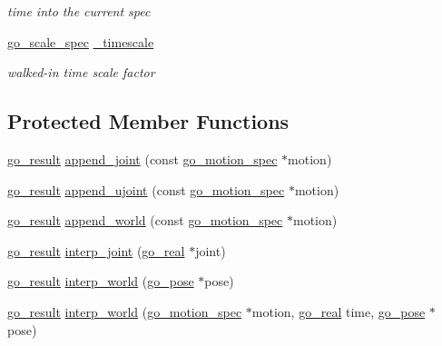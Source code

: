 \begin{DoxyCompactItemize}
\begin{DoxyCompactList}\small\item\em time into the current spec \end{DoxyCompactList}\item 
\hyperlink{structgomotion_1_1go__scale__spec}{go\-\_\-scale\-\_\-spec} \hyperlink{structgomotion_1_1go__motion__queue_a78ce1642f13b46e810ae781a827408e6}{\-\_\-timescale}
\begin{DoxyCompactList}\small\item\em walked-\/in time scale factor \end{DoxyCompactList}\end{DoxyCompactItemize}
\subsection*{Protected Member Functions}
\begin{DoxyCompactItemize}
\item 
\hyperlink{gotypes_8h_a55d48b38cd959f63c7e8db8337a9792a}{go\-\_\-result} \hyperlink{structgomotion_1_1go__motion__queue_a8530405c3ab2eb49c99b78804af3110f}{append\-\_\-joint} (const \hyperlink{structgomotion_1_1go__motion__spec}{go\-\_\-motion\-\_\-spec} $\ast$motion)
\item 
\hyperlink{gotypes_8h_a55d48b38cd959f63c7e8db8337a9792a}{go\-\_\-result} \hyperlink{structgomotion_1_1go__motion__queue_a9764d6dc903c426e1e5277bc2ffd26bc}{append\-\_\-ujoint} (const \hyperlink{structgomotion_1_1go__motion__spec}{go\-\_\-motion\-\_\-spec} $\ast$motion)
\item 
\hyperlink{gotypes_8h_a55d48b38cd959f63c7e8db8337a9792a}{go\-\_\-result} \hyperlink{structgomotion_1_1go__motion__queue_a59948ff83135837e9b87385a4b220571}{append\-\_\-world} (const \hyperlink{structgomotion_1_1go__motion__spec}{go\-\_\-motion\-\_\-spec} $\ast$motion)
\item 
\hyperlink{gotypes_8h_a55d48b38cd959f63c7e8db8337a9792a}{go\-\_\-result} \hyperlink{structgomotion_1_1go__motion__queue_a6d7f6a8773b64aa9dfa95639288634c6}{interp\-\_\-joint} (\hyperlink{gotypes_8h_afd666a2393eebd71ee455846ac9def9b}{go\-\_\-real} $\ast$joint)
\item 
\hyperlink{gotypes_8h_a55d48b38cd959f63c7e8db8337a9792a}{go\-\_\-result} \hyperlink{structgomotion_1_1go__motion__queue_a992ce6f5b03fc13da0fbd438d9bdb625}{interp\-\_\-world} (\hyperlink{structgomotion_1_1go__pose}{go\-\_\-pose} $\ast$pose)
\item 
\hyperlink{gotypes_8h_a55d48b38cd959f63c7e8db8337a9792a}{go\-\_\-result} \hyperlink{structgomotion_1_1go__motion__queue_a5b0db307f2635f1cf5b643f68aed98ab}{interp\-\_\-world} (\hyperlink{structgomotion_1_1go__motion__spec}{go\-\_\-motion\-\_\-spec} $\ast$motion, \hyperlink{gotypes_8h_afd666a2393eebd71ee455846ac9def9b}{go\-\_\-real} time, \hyperlink{structgomotion_1_1go__pose}{go\-\_\-pose} $\ast$pose)
\end{DoxyCompactItemize}


